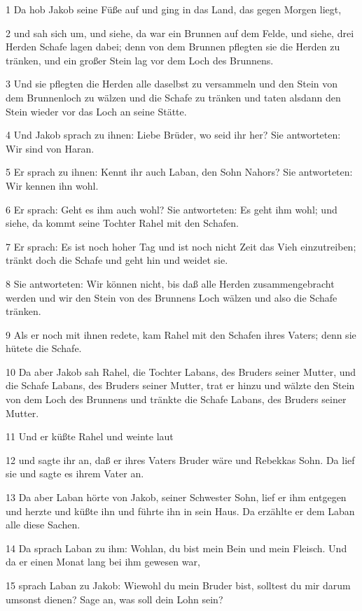 \par 1 Da hob Jakob seine Füße auf und ging in das Land, das gegen Morgen liegt,
\par 2 und sah sich um, und siehe, da war ein Brunnen auf dem Felde, und siehe, drei Herden Schafe lagen dabei; denn von dem Brunnen pflegten sie die Herden zu tränken, und ein großer Stein lag vor dem Loch des Brunnens.
\par 3 Und sie pflegten die Herden alle daselbst zu versammeln und den Stein von dem Brunnenloch zu wälzen und die Schafe zu tränken und taten alsdann den Stein wieder vor das Loch an seine Stätte.
\par 4 Und Jakob sprach zu ihnen: Liebe Brüder, wo seid ihr her? Sie antworteten: Wir sind von Haran.
\par 5 Er sprach zu ihnen: Kennt ihr auch Laban, den Sohn Nahors? Sie antworteten: Wir kennen ihn wohl.
\par 6 Er sprach: Geht es ihm auch wohl? Sie antworteten: Es geht ihm wohl; und siehe, da kommt seine Tochter Rahel mit den Schafen.
\par 7 Er sprach: Es ist noch hoher Tag und ist noch nicht Zeit das Vieh einzutreiben; tränkt doch die Schafe und geht hin und weidet sie.
\par 8 Sie antworteten: Wir können nicht, bis daß alle Herden zusammengebracht werden und wir den Stein von des Brunnens Loch wälzen und also die Schafe tränken.
\par 9 Als er noch mit ihnen redete, kam Rahel mit den Schafen ihres Vaters; denn sie hütete die Schafe.
\par 10 Da aber Jakob sah Rahel, die Tochter Labans, des Bruders seiner Mutter, und die Schafe Labans, des Bruders seiner Mutter, trat er hinzu und wälzte den Stein von dem Loch des Brunnens und tränkte die Schafe Labans, des Bruders seiner Mutter.
\par 11 Und er küßte Rahel und weinte laut
\par 12 und sagte ihr an, daß er ihres Vaters Bruder wäre und Rebekkas Sohn. Da lief sie und sagte es ihrem Vater an.
\par 13 Da aber Laban hörte von Jakob, seiner Schwester Sohn, lief er ihm entgegen und herzte und küßte ihn und führte ihn in sein Haus. Da erzählte er dem Laban alle diese Sachen.
\par 14 Da sprach Laban zu ihm: Wohlan, du bist mein Bein und mein Fleisch. Und da er einen Monat lang bei ihm gewesen war,
\par 15 sprach Laban zu Jakob: Wiewohl du mein Bruder bist, solltest du mir darum umsonst dienen? Sage an, was soll dein Lohn sein?
